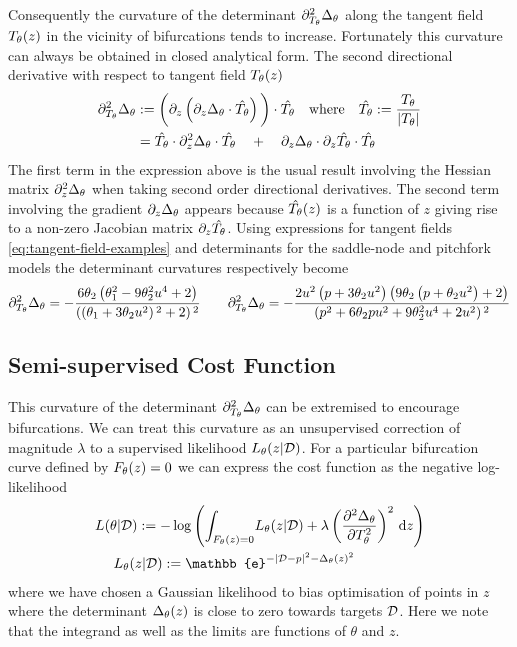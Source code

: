 Consequently the curvature of the determinant $\partial_{T_{\theta}}^2\Delta_{\theta}$ along the tangent field $T_{\theta}(z)$ in the vicinity of bifurcations tends to increase. Fortunately this curvature can always be obtained in closed analytical form. The second directional derivative with respect to tangent field $T_{\theta}(z)$
\begin{align}
    \partial_{T_{\theta}}^2\Delta_{\theta} &:=
    \bigg(
        \partial_z\left(
            \partial_z\Delta_{\theta} \cdot \hat{T_{\theta}}
        \right)
    \bigg)\cdot \hat{T_{\theta}}\quad
    \mathrm{where} \quad \hat{T_{\theta}}:=\frac{T_{\theta}}{|T_{\theta}|}\\
    &=
    \hat{T_{\theta}}\cdot\partial_z^2\Delta_{\theta}\cdot\hat{T_{\theta}}
    \quad+\quad
    \partial_z\Delta_{\theta}\cdot\partial_z\hat{T_{\theta}}\cdot\hat{T_{\theta}}
\end{align}
The first term in the expression above is the usual result involving the Hessian matrix $\partial_z^2\Delta_{\theta}$ when taking second order directional derivatives. The second term involving the gradient $\partial_z\Delta_{\theta}$ appears because $\hat{T_{\theta}}(z)$ is a function of $z$ giving rise to a non-zero Jacobian matrix $\partial_z \hat{T_{\theta}}$. Using expressions for tangent fields \eqref{eq:tangent-field-examples} and determinants for the saddle-node and pitchfork models the determinant curvatures respectively become
\begin{align}
    \partial_{T_{\theta}}^2\Delta_{\theta} =
    -\frac{6 \theta_2 \left(\theta _1^2-9 \theta _2^2 u^4+2\right)}
    {\left(\left(\theta _1+3 \theta _2 u^2\right){}^2+2\right){}^2}
    \qquad
    \partial_{T_{\theta}}^2\Delta_{\theta} =
    -\frac{2 u^2 \left(p+3 \theta _2 u^2\right) \left(9 \theta _2 \left(p+\theta _2 u^2\right)+2\right)}{\left(p^2+6 \theta _2 p u^2+9 \theta _2^2 u^4+2 u^2\right){}^2}
\end{align}
\subsection{Semi-supervised Cost Function}

This curvature of the determinant $\partial_{T_{\theta}}^2\Delta_{\theta}$ can be extremised to encourage bifurcations. We can treat this curvature as an unsupervised correction of magnitude $\lambda$ to a supervised likelihood $L_{\theta}(z|\mathcal{D})$. For a particular bifurcation curve defined by $F_{\theta}(z)=0$ we can express the cost function as the negative log-likelihood
\begin{align}
    \loss(\theta|\targets) := -\log\left(\int_{\rates(z)=0}\!
    L_{\theta}(z|\targets) + \lambda\left( \frac{\partial^2\Det}{\partial\tangent^2} \right)^2
    \,\mathrm{d}z\right)\\
    L_{\theta}(z|\targets) := \mathbb{e}^{-|\targets-p|^2-\Det(z)^2}\qquad\qquad\quad
\end{align}
where we have chosen a Gaussian likelihood to bias optimisation of points in $z$ where the determinant $\Delta_{\theta}(z)$ is close to zero towards targets $\mathcal{D}$. Here we note that the integrand as well as the limits are functions of $\theta$ and $z$.

